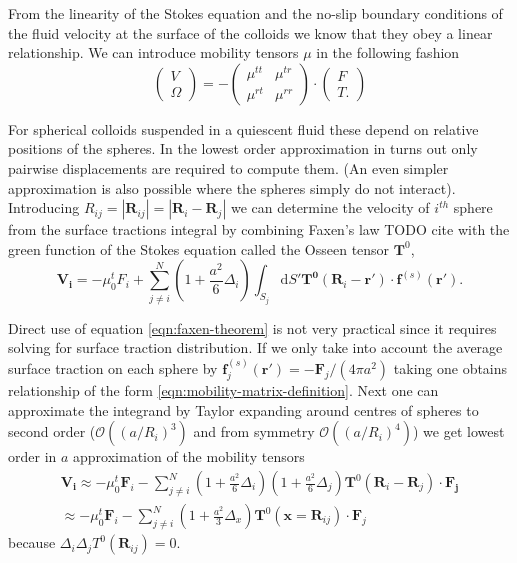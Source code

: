 \documentclass{doctoral}
\newcommand{\dd}{\mathrm{d}}
\begin{document}
From the linearity of the Stokes equation and the no-slip boundary conditions of the fluid velocity at the surface of the colloids we know that they obey a linear relationship. We can introduce mobility tensors $\mu$ in the following fashion
\begin{equation}
    \begin{pmatrix}
        V \\ \Omega
    \end{pmatrix} = 
    - \begin{pmatrix}
        \mu^{tt} & \mu^{tr} \\
        \mu^{rt} & \mu^{rr}
    \end{pmatrix}
    \cdot \begin{pmatrix}
        F \\ T.
    \end{pmatrix}
    \label{eqn:mobility-matrix-definition}
\end{equation}

For spherical colloids suspended in a quiescent fluid these depend on relative positions of the spheres. In the lowest order approximation in turns out only pairwise displacements are required to compute them. (An even simpler approximation is also possible where the spheres simply do not interact). Introducing $R_{ij} = |\bm{R}_{ij}| = |\bm{R}_i - \bm{R}_j|$ we can determine the velocity of $i^{th}$ sphere from the surface tractions integral by combining Faxen's law TODO cite with the green function of the Stokes equation called the Osseen tensor $\bm{T}^0$,
\begin{equation}
    \bm{V_i} = -\mu_0^t F_i + \sum_{j\neq i}^N (1 + \frac{a^2}{6} \Delta_i) \int_{S_j} \dd S' \bm{T^0}(\bm{R}_i-\bm{r'})\cdot \bm{f}^{(s)}(\bm{r'}).
    \label{eqn:faxen-theorem}
\end{equation}

Direct use of equation \eqref{eqn:faxen-theorem} is not very practical since it requires solving for surface traction distribution. If we only take into account the average surface traction on each sphere  by $\bm{f}_j^{(s)}(\bm{r'}) = -\bm{F}_j / (4\pi a^2)$ taking one obtains relationship of the form \eqref{eqn:mobility-matrix-definition}. Next one can approximate the integrand by Taylor expanding around centres of spheres to second order ($\mathcal{O}((a/R_i)^3)$ and from symmetry $\mathcal{O}((a/R_i)^4)$) we get lowest order in $a$ approximation of the mobility tensors
\begin{eqnarray}
    \bm{V_i} \approx -\mu_0^t \bm{F}_i  - \sum_{j\neq i}^N (1 + \frac{a^2}{6} \Delta_i) (1 + \frac{a^2}{6} \Delta_j) \bm{T}^{0} (\bm{R}_i - \bm{R}_j) \cdot \bm{F_j} \\
    \approx -\mu_0^t \bm{F}_i  - \sum_{j\neq i}^N (1 + \frac{a^2}{3} \Delta_x) \bm{T}^{0} (\bm{x} = \bm{R}_{ij}) \cdot \bm{F}_j
    \label{eqn:rotne-prager-derivation}
\end{eqnarray}
because $\Delta_i \Delta_j T^0(\bm{R}_{ij}) = 0$.
\end{document}
